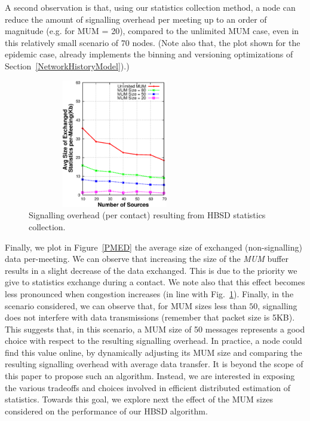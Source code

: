 A second observation is that, using our statistics collection method, a node can reduce the amount of signalling overhead per meeting up to an order of magnitude (e.g. for MUM = 20), compared to the unlimited MUM case, even in this relatively small scenario of $70$ nodes. (Note also that, the plot shown for the epidemic case, already implements the binning and versioning optimizations of Section~\ref{NetworkHistoryModel}).)

\begin{figure}[!h]
\centering
\includegraphics[width=3in,height=2.2in]{Chapitre3/fig7.eps}
\caption{Signalling overhead (per contact) resulting from HBSD statistics collection.}
\label{StatOverhead}
\end{figure}

Finally, we plot in Figure~\ref{PMED} the average size of exchanged (non-signalling) data per-meeting. We can observe that increasing the size of the \emph{MUM} buffer results in a slight decrease of the data exchanged. This is due to the priority we give to statistics exchange during a contact. We note also that this effect becomes less pronounced when congestion increases (in line with Fig.~\ref{StatOverhead}). Finally, in the scenario considered, we can observe that, for MUM sizes less than $50$, signalling does not interfere with data transmissions (remember that packet size is 5KB). This suggests that, in this scenario, a MUM size of 50 messages represents a good choice with respect to the resulting signalling overhead. In practice, a node could find this value online, by dynamically adjusting its MUM size and comparing the resulting signalling overhead with average data transfer. It is beyond the scope of this paper to propose such an algorithm. Instead, we are interested in exposing the various tradeoffs and choices involved in efficient distributed estimation of statistics. Towards this goal, we explore next the effect of the MUM sizes considered on the performance of our HBSD algorithm.


